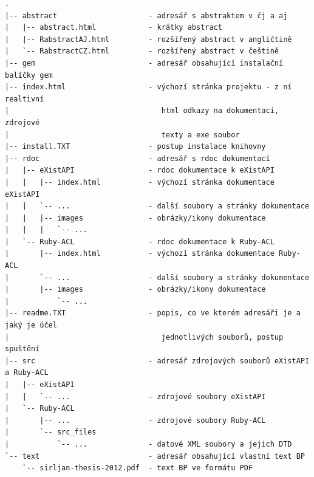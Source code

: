 \documentclass[11pt,twoside,a4paper]{book}
\begin{document}
\begin{verbatim}
.
|-- abstract                     - adresář s abstraktem v čj a aj
|   |-- abstract.html            - krátky abstract
|   |-- RabstractAJ.html         - rozšířený abstract v angličtině
|   `-- RabstractCZ.html         - rozšířený abstract v češtině
|-- gem                          - adresář obsahující instalační balíčky gem
|-- index.html                   - výchozí stránka projektu - z ní realtivní 
|                                   html odkazy na dokumentaci, zdrojové 
|                                   texty a exe soubor
|-- install.TXT                  - postup instalace knihovny
|-- rdoc                         - adresář s rdoc dokumentací
|   |-- eXistAPI                 - rdoc dokumentace k eXistAPI
|   |   |-- index.html           - výchozí stránka dokumentace eXistAPI  
|   |   `-- ...                  - další soubory a stránky dokumentace
|   |   |-- images               - obrázky/ikony dokumentace
|   |   |   `-- ...
|   `-- Ruby-ACL                 - rdoc dokumentace k Ruby-ACL
|       |-- index.html           - výchozí stránka dokumentace Ruby-ACL 
|       `-- ...                  - další soubory a stránky dokumentace
|       |-- images               - obrázky/ikony dokumentace
|           `-- ...
|-- readme.TXT                   - popis, co ve kterém adresáři je a jaký je účel 
|                                   jednotlivých souborů, postup spuštění
|-- src                          - adresář zdrojových souborů eXistAPI a Ruby-ACL
|   |-- eXistAPI
|   |   `-- ...                  - zdrojové soubory eXistAPI
|   `-- Ruby-ACL                        
|       |-- ...                  - zdrojové soubory Ruby-ACL
|       `-- src_files                   
|           `-- ...              - datové XML soubory a jejich DTD
`-- text                         - adresář obsahující vlastní text BP
    `-- sirljan-thesis-2012.pdf  - text BP ve formátu PDF
\end{verbatim}
\end{document}
